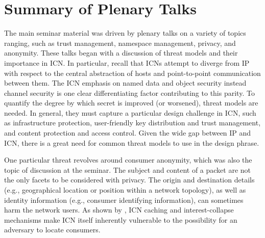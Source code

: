 \section{Summary of Plenary Talks} \label{sec:plenary-talks}
The main seminar material was driven by plenary talks on a variety of topics
ranging, such as trust management, namespace management, privacy, and anonymity.
These talks began with a discussion of threat models and their importance in ICN.
In particular, recall that ICNs attempt to diverge from IP with respect
to the central abstraction of hosts and point-to-point communication between
them. The ICN emphasis on named data and object security instead channel security
is one clear differentiating factor contributing to this parity. To quantify
the degree by which secret is improved (or worsened), threat models are needed.
In general, they must capture a particular design challenge in ICN, such as
infrastructure protection, user-friendly key distribution and trust management, and content protection and access control.  Given the wide gap
between IP and ICN, there is a great need for common threat models to use
in the design phrase.

One particular threat revolves around consumer anonymity, which was also
the topic of discussion at the seminar. The subject and content
of a packet are not the only facets to be considered with privacy.
The origin and destination details (e.g., geographical location or position within a network
topology), as well as identity information (e.g., consumer identifying information),
can sometimes harm the network users. As shown by \cite{compagno2015violating}, ICN caching and interest-collapse mechanisms make ICN itself inherently vulnerable to the possibility for an adversary to locate
consumers. %

